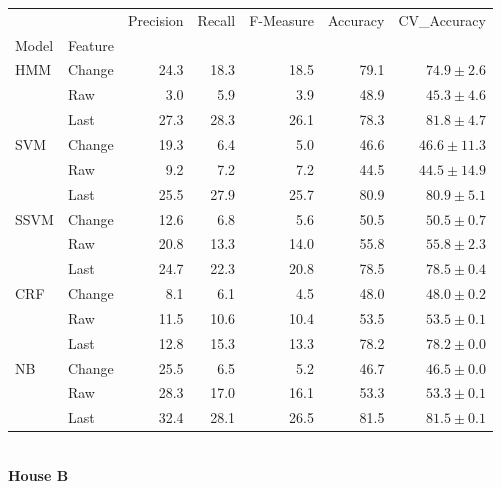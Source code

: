 \documentclass{article}
\begin{document}
\begin{tabular}{llrrrrr}
\toprule
    &        &  Precision &  Recall &  F-Measure &  Accuracy &    CV\_Accuracy \\
Model & Feature &            &         &            &           &                \\
\midrule
HMM & Change &       24.3 &    18.3 &       18.5 &      79.1 &   $74.9\pm2.6$ \\
    & Raw &        3.0 &     5.9 &        3.9 &      48.9 &   $45.3\pm4.6$ \\
    & Last &       27.3 &    28.3 &       26.1 &      78.3 &   $81.8\pm4.7$ \\
SVM & Change &       19.3 &     6.4 &        5.0 &      46.6 &  $46.6\pm11.3$ \\
    & Raw &        9.2 &     7.2 &        7.2 &      44.5 &  $44.5\pm14.9$ \\
    & Last &       25.5 &    27.9 &       25.7 &      80.9 &   $80.9\pm5.1$ \\
SSVM & Change &       12.6 &     6.8 &        5.6 &      50.5 &   $50.5\pm0.7$ \\
    & Raw &       20.8 &    13.3 &       14.0 &      55.8 &   $55.8\pm2.3$ \\
    & Last &       24.7 &    22.3 &       20.8 &      78.5 &   $78.5\pm0.4$ \\
CRF & Change &        8.1 &     6.1 &        4.5 &      48.0 &   $48.0\pm0.2$ \\
    & Raw &       11.5 &    10.6 &       10.4 &      53.5 &   $53.5\pm0.1$ \\
    & Last &       12.8 &    15.3 &       13.3 &      78.2 &   $78.2\pm0.0$ \\
NB & Change &       25.5 &     6.5 &        5.2 &      46.7 &   $46.5\pm0.0$ \\
    & Raw &       28.3 &    17.0 &       16.1 &      53.3 &   $53.3\pm0.1$ \\
    & Last &       32.4 &    28.1 &       26.5 &      81.5 &   $81.5\pm0.1$ \\
\bottomrule
\end{tabular}
\vspace{1cm}\\
\textbf{House B}\\
\vspace{1cm}\\
\end{document}
